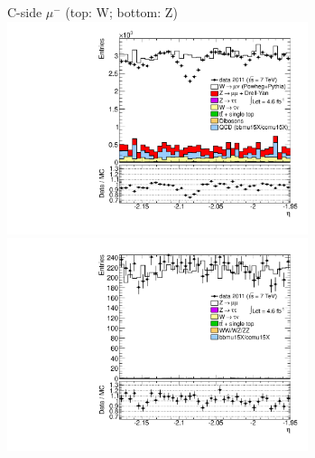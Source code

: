 {{\cole
}


 {
\colb[T]

C-side $\mu^{-}$ (top: W; bottom: Z)
\centering
\includegraphics[width=0.66\textwidth]{dates/20130306/figures/etaphi/Wpt2535_10_C_stack_l_eta_NEG} \\
\includegraphics[width=0.66\textwidth]{dates/20130306/figures/etaphi/Zpt2535_10_C_stack_lN_eta_ALL.pdf}

}}
